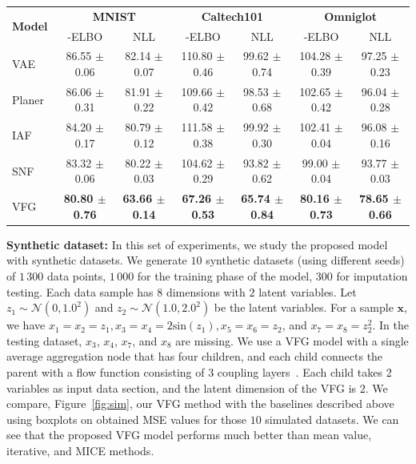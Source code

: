 \documentclass[sigconf, anonymous, review]{acmart}
\theoremstyle{plain}
\theoremstyle{definition}
\theoremstyle{remark}
\begin{document}
\begin{table}[t]
\centering
{\small
\label{tab:elbo}
\begin{tabular}{l | c  c   c  c  c  c }
\hline
 \multirow{2}{0nc}{\textbf{Model}} & \multicolumn{2}{c}{\textbf{MNIST}} & \multicolumn{2}{c}{\textbf{Caltech101}} & \multicolumn{2}{c}{\textbf{Omniglot}} \\
 & -ELBO & NLL  &  -ELBO & NLL  & -ELBO & NLL  \\
\hline
 VAE~\cite{kingma2013auto} & 86.55 $\pm$ 0.06  & 82.14 $\pm$ 0.07& 110.80 $\pm$ 0.46 & 99.62 $\pm$ 0.74 & 104.28 $\pm$ 0.39 & 97.25 $\pm$ 0.23 \\
Planer~\cite{rezende2015variational} & 86.06 $\pm$ 0.31 & 81.91 $\pm$ 0.22 & 109.66 $\pm$ 0.42 & 98.53 $\pm$ 0.68 & 102.65 $\pm$ 0.42 & 96.04 $\pm$ 0.28 \\
IAF~\cite{kingma2016improving} & 84.20 $\pm$ 0.17& 80.79 $\pm$ 0.12 & 111.58 $\pm$ 0.38 & 99.92 $\pm$ 0.30 & 102.41 $\pm$ 0.04 & 96.08 $\pm$ 0.16 \\
SNF~\cite{berg2018sylvester} & 83.32 $\pm$ 0.06 & 80.22 $\pm$ 0.03 & 104.62 $\pm$ 0.29 & 93.82 $\pm$ 0.62 & 99.00 $\pm$ 0.04 & 93.77 $\pm$ 0.03 \\
\hline
VFG &\textbf{80.80 $\pm$ 0.76} & \textbf{63.66 $\pm$ 0.14} & \textbf{67.26 $\pm$ 0.53} & \textbf{65.74 $\pm$ 0.84}  &\textbf{80.16 $\pm$ 0.73 } & \textbf{78.65 $\pm$ 0.66}\\  
\hline
\end{tabular}
\vspace{-0.1in}
}
\end{table}

\textbf{Synthetic dataset: } In this set of experiments, we study the proposed model with synthetic datasets.
We generate $10$ synthetic datasets (using different seeds) of $1\,300$ data points, $1\,000$ for the training phase of the model, $300$ for imputation testing. 
Each data sample  has $8$ dimensions with $2$ latent variables. 
Let $z_1 \sim \mathcal{N}(0,1.0^2)$ and $z_2 \sim  \mathcal{N}(1.0,2.0^2)$ be the latent variables. For a sample $\mathbf{x}$, we have  $x_1=x_2 = z_1, x_3=x_4= 2\textrm{sin}(z_1), x_5=x_6 =z_2$, and $x_7= x_8 = z_2^2$.  In the testing dataset, $x_3$, $x_4$, $x_7$, and $x_8$ are missing. We use a VFG model with a single average aggregation node that has four children, and each child connects the parent with a flow function consisting of 3 coupling layers~\cite{Dinh2016DensityEU}. 
Each child takes 2 variables as input data section, and the latent dimension of the VFG is $2$.
We compare, Figure~\ref{fig:sim}, our VFG method with the baselines described above using boxplots on obtained MSE values for those $10$ simulated datasets.
We can see that the proposed VFG model performs much better than mean value, iterative, and MICE methods. 
\end{document}
